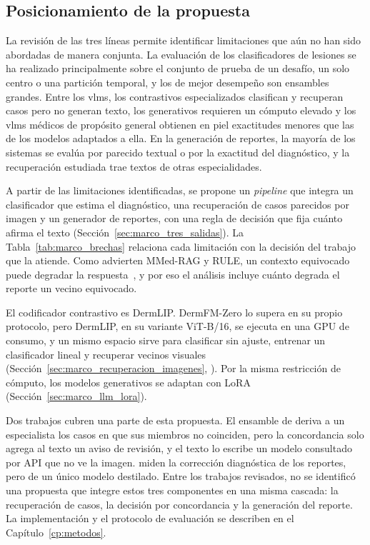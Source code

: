 \FloatBarrier
\subsection{Posicionamiento de la propuesta}
\label{sec:estado_arte_posicion}

La revisión de las tres líneas permite identificar limitaciones que aún no han sido abordadas de manera conjunta.
La evaluación de los clasificadores de lesiones se ha realizado principalmente sobre el conjunto de prueba de un desafío, un
solo centro o una partición temporal, y los de mejor desempeño son ensambles grandes. Entre los \glspl{vlm}, los
contrastivos especializados clasifican y recuperan casos pero no generan texto, los generativos requieren un
cómputo elevado y los \glspl{vlm} médicos de propósito general obtienen en piel exactitudes menores que las de los
modelos adaptados a ella. En la generación de reportes, la mayoría de los sistemas se evalúa por parecido textual o
por la exactitud del diagnóstico, y la recuperación estudiada trae textos de otras especialidades.

A partir de las limitaciones identificadas, se propone un \emph{pipeline} que integra un clasificador que estima el
diagnóstico, una recuperación de casos parecidos por imagen y un generador de reportes, con una regla de decisión
que fija cuánto afirma el texto (Sección~\ref{sec:marco_tres_salidas}). La Tabla~\ref{tab:marco_brechas} relaciona
cada limitación con la decisión del trabajo que la atiende. Como advierten MMed-RAG y RULE, un contexto equivocado
puede degradar la respuesta~\cite{xia2025mmedrag,xia2024rule}, y por eso el análisis incluye cuánto degrada el
reporte un vecino equivocado.

El codificador contrastivo es DermLIP. DermFM-Zero lo supera en su propio protocolo, pero DermLIP, en su variante
ViT-B/16, se ejecuta en una GPU de consumo, y un mismo espacio sirve para clasificar sin ajuste, entrenar un
clasificador lineal y recuperar vecinos visuales (Sección~\ref{sec:marco_recuperacion_imagenes},
\cite{yan2025derm1miccv}). Por la misma restricción de cómputo, los modelos generativos se adaptan con LoRA
(Sección~\ref{sec:marco_llm_lora}).

Dos trabajos cubren una parte de esta propuesta. El ensamble de \textcite{khan2025ensemble} deriva a un
especialista los casos en que sus miembros no coinciden, pero la concordancia solo agrega al texto un aviso de
revisión, y el texto lo escribe un modelo consultado por API que no ve la imagen. \textcite{chakrabarti2025skin}
miden la corrección diagnóstica de los reportes, pero de un único modelo destilado. Entre los trabajos revisados, no se identificó una propuesta que integre estos tres componentes en una misma cascada: la recuperación de casos, la decisión por concordancia y la generación del reporte. La implementación y el
protocolo de evaluación se describen en el Capítulo~\ref{cp:metodos}.

